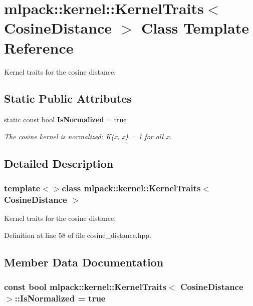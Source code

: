 \section{mlpack\-:\-:kernel\-:\-:Kernel\-Traits$<$ Cosine\-Distance $>$ Class Template Reference}
\label{classmlpack_1_1kernel_1_1KernelTraits_3_01CosineDistance_01_4}


Kernel traits for the cosine distance.  


\subsection*{Static Public Attributes}
\begin{DoxyCompactItemize}
\item 
static const bool {\bf Is\-Normalized} = true
\begin{DoxyCompactList}\small\item\em The cosine kernel is normalized\-: K(x, x) = 1 for all x. \end{DoxyCompactList}\end{DoxyCompactItemize}


\subsection{Detailed Description}
\subsubsection*{template$<$$>$class mlpack\-::kernel\-::\-Kernel\-Traits$<$ Cosine\-Distance $>$}

Kernel traits for the cosine distance. 

Definition at line 58 of file cosine\-\_\-distance.\-hpp.



\subsection{Member Data Documentation}
\subsubsection[{Is\-Normalized}]{\setlength{\rightskip}{0pt plus 5cm}const bool {\bf mlpack\-::kernel\-::\-Kernel\-Traits}$<$ {\bf Cosine\-Distance} $>$\-::Is\-Normalized = true\hspace{0.3cm}{\ttfamily [static]}}\label{classmlpack_1_1kernel_1_1KernelTraits_3_01CosineDistance_01_4_af915c9c00b155743e7b1087802f20854}


